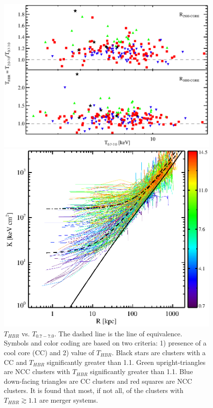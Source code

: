 \documentclass[12pt]{cv}
\begin{document}
\clearpage
{}
\begin{figure}[t]
    \begin{minipage}[t]{0.5\linewidth}
        \centering
        \includegraphics*[width=\textwidth, trim=17mm 3mm 10mm 11mm, clip]{thbr.eps}
        \caption{\footnotesize $T_{HBR}$ vs. $T_{0.7-7.0}$. The dashed
          line is the line of equivalence. Symbols and color coding
          are based on two criteria: 1) presence of a cool core (CC)
          and 2) value of $T_{HBR}$. Black stars are clusters with a
          CC and $T_{HBR}$ significantly greater than 1.1. Green
          upright-triangles are NCC clusters with $T_{HBR}$
          significantly greater than 1.1. Blue down-facing triangles
          are CC clusters and red squares are NCC clusters. It is
          found that most, if not all, of the clusters with $T_{HBR}
          \gtrsim 1.1$ are merger systems.}
        \label{fig:thbr}
    \end{minipage}
    \hspace{0.1in}
    \begin{minipage}[t]{0.5\linewidth}
        \centering
        \includegraphics*[width=\textwidth, trim=28mm 7mm 30mm 17mm, clip]{splots_allt.eps}

\end{minipage}
\end{figure}
\end{document}
